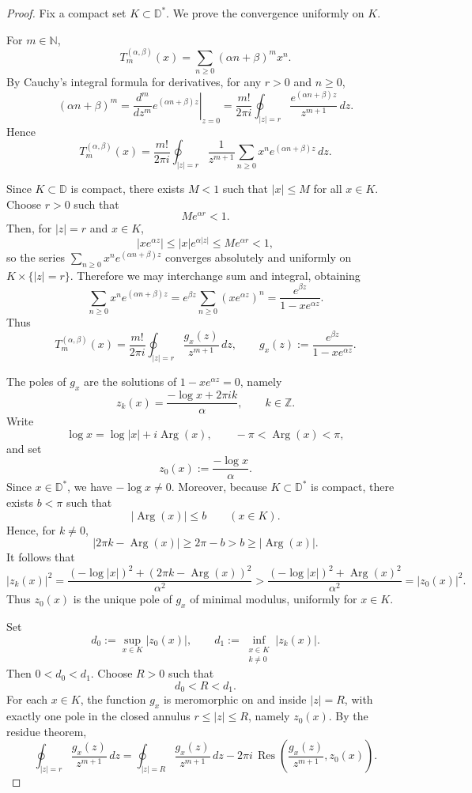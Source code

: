 \documentclass[11pt,twoside]{article}
\newcommand{\Arg}{\operatorname{Arg}}
\numberwithin{equation}{section}
\begin{document}
\begin{proof}
Fix a compact set \(K\subset\mathbb D^\ast\). We prove the convergence uniformly on \(K\).

For \(m\in\mathbb N\),
\[
T_m^{(\alpha,\beta)}(x)=\sum_{n\ge0}(\alpha n+\beta)^m x^n.
\]
By Cauchy's integral formula for derivatives, for any \(r>0\) and \(n\ge0\),
\[
(\alpha n+\beta)^m
=
\left.\frac{d^m}{dz^m}e^{(\alpha n+\beta)z}\right|_{z=0}
=
\frac{m!}{2\pi i}\oint_{|z|=r}\frac{e^{(\alpha n+\beta)z}}{z^{m+1}}\,dz.
\]
Hence
\[
T_m^{(\alpha,\beta)}(x)
=
\frac{m!}{2\pi i}\oint_{|z|=r}\frac{1}{z^{m+1}}
\sum_{n\ge0}x^n e^{(\alpha n+\beta)z}\,dz.
\]

Since \(K\subset\mathbb D\) is compact, there exists \(M<1\) such that \(|x|\le M\) for all \(x\in K\).
Choose \(r>0\) such that
\[
Me^{\alpha r}<1.
\]
Then, for \(|z|=r\) and \(x\in K\),
\[
|x e^{\alpha z}|
\le |x|e^{\alpha|z|}
\le Me^{\alpha r}
<1,
\]
so the series \(\sum_{n\ge0}x^n e^{(\alpha n+\beta)z}\) converges absolutely and uniformly on
\(K\times\{|z|=r\}\). Therefore we may interchange sum and integral, obtaining
\[
\sum_{n\ge0}x^n e^{(\alpha n+\beta)z}
=
e^{\beta z}\sum_{n\ge0}(x e^{\alpha z})^n
=
\frac{e^{\beta z}}{1-x e^{\alpha z}}.
\]
Thus
\[
T_m^{(\alpha,\beta)}(x)
=
\frac{m!}{2\pi i}\oint_{|z|=r}\frac{g_x(z)}{z^{m+1}}\,dz,
\qquad
g_x(z):=\frac{e^{\beta z}}{1-x e^{\alpha z}}.
\]

The poles of \(g_x\) are the solutions of \(1-x e^{\alpha z}=0\), namely
\[
z_k(x)=\frac{-\log x+2\pi i k}{\alpha},
\qquad k\in\mathbb Z.
\]
Write
\[
\log x=\log|x|+i\Arg(x),
\qquad -\pi<\Arg(x)<\pi,
\]
and set
\[
z_0(x):=\frac{-\log x}{\alpha}.
\]
Since \(x\in\mathbb D^\ast\), we have \(-\log x\neq0\). Moreover, because \(K\subset\mathbb D^\ast\) is compact,
there exists \(b<\pi\) such that
\[
|\Arg(x)|\le b
\qquad (x\in K).
\]
Hence, for \(k\neq0\),
\[
|2\pi k-\Arg(x)|\ge 2\pi-b>b\ge |\Arg(x)|.
\]
It follows that
\[
|z_k(x)|^2
=
\frac{(-\log|x|)^2+(2\pi k-\Arg(x))^2}{\alpha^2}
>
\frac{(-\log|x|)^2+\Arg(x)^2}{\alpha^2}
=
|z_0(x)|^2.
\]
Thus \(z_0(x)\) is the unique pole of \(g_x\) of minimal modulus, uniformly for \(x\in K\).

Set
\[
d_0:=\sup_{x\in K}|z_0(x)|,
\qquad
d_1:=\inf_{\substack{x\in K\\ k\neq0}}|z_k(x)|.
\]
Then \(0<d_0<d_1\). Choose \(R>0\) such that
\[
d_0<R<d_1.
\]
For each \(x\in K\), the function \(g_x\) is meromorphic on and inside \(|z|=R\), with exactly one pole
in the closed annulus \(r\le |z|\le R\), namely \(z_0(x)\). By the residue theorem,
\[
\oint_{|z|=r}\frac{g_x(z)}{z^{m+1}}\,dz
=
\oint_{|z|=R}\frac{g_x(z)}{z^{m+1}}\,dz
-
2\pi i\,\operatorname{Res}\!\left(\frac{g_x(z)}{z^{m+1}},z_0(x)\right).
\]


\end{proof}
\end{document}
